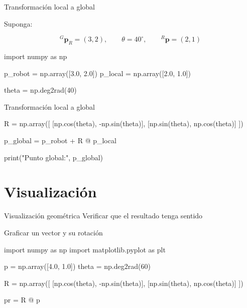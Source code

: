 \documentclass[aspectratio=169]{beamer}
\begin{document}
\begin{frame}[fragile]{Transformación local a global}

    Suponga:

    \[
    {}^{G}\mathbf{p}_R=(3,2),
    \qquad
    \theta=40^\circ,
    \qquad
    {}^{R}\mathbf{p}=(2,1)
    \]

    \begin{pythoncodedark}
        import numpy as np

        p_robot = np.array([3.0, 2.0])
        p_local = np.array([2.0, 1.0])

        theta = np.deg2rad(40)
    \end{pythoncodedark}

\end{frame}

\begin{frame}[fragile]{Transformación local a global}

    \begin{pythoncodedark}
        R = np.array([
            [np.cos(theta), -np.sin(theta)],
            [np.sin(theta),  np.cos(theta)]
            ])

        p_global = p_robot + R @ p_local

        print("Punto global:", p_global)
    \end{pythoncodedark}




\end{frame}

\section{Visualización}

\SectionSlide
{Visualización geométrica}
{Verificar que el resultado tenga sentido}

\begin{frame}[fragile]{Graficar un vector y su rotación}

    \begin{pythoncodedark}
        import numpy as np
        import matplotlib.pyplot as plt

        p = np.array([4.0, 1.0])
        theta = np.deg2rad(60)

        R = np.array([
            [np.cos(theta), -np.sin(theta)],
            [np.sin(theta),  np.cos(theta)]
            ])

        pr = R @ p
    \end{pythoncodedark}

\end{frame}
\end{document}
